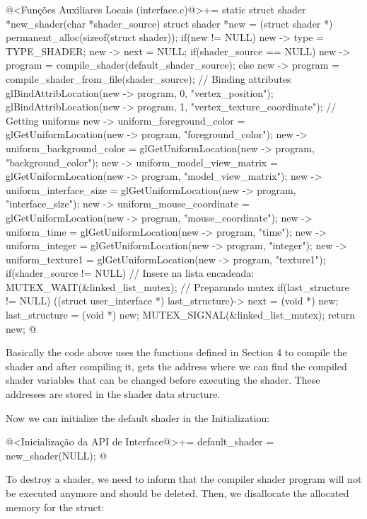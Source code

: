 \iniciocodigo
@<Funções Auxiliares Locais (interface.c)@>+=
static struct shader *new_shader(char *shader_source){
  struct shader *new = (struct shader *) permanent_alloc(sizeof(struct shader));
  if(new != NULL){
    new -> type = TYPE_SHADER;
    new -> next = NULL;
    if(shader_source == NULL)
      new -> program = compile_shader(default_shader_source);
    else
      new -> program = compile_shader_from_file(shader_source);
    // Binding attributes
    glBindAttribLocation(new -> program, 0, "vertex_position");
    glBindAttribLocation(new -> program, 1, "vertex_texture_coordinate");
    // Getting uniforms
    new -> uniform_foreground_color =  glGetUniformLocation(new -> program,
                                                            "foreground_color");
    new -> uniform_background_color =  glGetUniformLocation(new -> program,
                                                            "background_color");
    new -> uniform_model_view_matrix = glGetUniformLocation(new -> program,
                                                            "model_view_matrix");
    new -> uniform_interface_size = glGetUniformLocation(new -> program,
                                                         "interface_size");
    new -> uniform_mouse_coordinate = glGetUniformLocation(new -> program,
                                                         "mouse_coordinate");
    new -> uniform_time = glGetUniformLocation(new -> program, "time");
    new -> uniform_integer = glGetUniformLocation(new -> program, "integer");
    new -> uniform_texture1 = glGetUniformLocation(new -> program, "texture1");
    if(shader_source != NULL){ // Insere na lista encadeada:
      MUTEX_WAIT(&linked_list_mutex); // Preparando mutex
      if(last_structure != NULL)
        ((struct user_interface *) last_structure)-> next = (void *) new;
      last_structure = (void *) new;
      MUTEX_SIGNAL(&linked_list_mutex);
    }
  }
  return new;
}
@
\fimcodigo

Basically the code above uses the functions defined in Section 4 to
compile the shader and after compiling it, gets the address where we
can find the compiled shader variables that can be changed before
executing the shader. These addresses are stored in the shader data
structure.

Now we can initialize the default shader in the Initialization:

\iniciocodigo
@<Inicialização da API de Interface@>+=
default_shader = new_shader(NULL);
@
\fimcodigo

To destroy a shader, we need to inform that the compiler shader
program will not be executed anymore and should be deleted. Then, we
disallocate the allocated memory for the struct:

